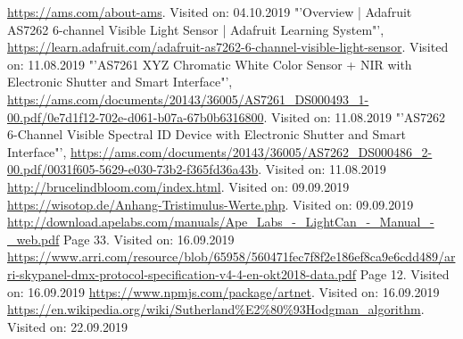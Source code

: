 \documentclass[11pt]{scrartcl}
\begin{document}
{\begin{thebibliography}{xxxxxxxxxxxxxxxxxxx}
     \url{https://ams.com/about-ams}. Visited on: 04.10.2019
    "'Overview | Adafruit AS7262 6-channel Visible Light Sensor | Adafruit Learning System"', \url{https://learn.adafruit.com/adafruit-as7262-6-channel-visible-light-sensor}. Visited on: 11.08.2019
    "'AS7261 XYZ Chromatic White Color Sensor + NIR with Electronic Shutter and Smart Interface"', \url{https://ams.com/documents/20143/36005/AS7261_DS000493_1-00.pdf/0e7d1f12-702e-d061-b07a-67b0b6316800}. Visited on: 11.08.2019
    "'AS7262 6-Channel Visible Spectral ID Device with Electronic Shutter and Smart Interface"', \url{https://ams.com/documents/20143/36005/AS7262_DS000486_2-00.pdf/0031f605-5629-e030-73b2-f365fd36a43b}. Visited on: 11.08.2019
     \url{http://brucelindbloom.com/index.html}. Visited on: 09.09.2019
     \url{https://wisotop.de/Anhang-Tristimulus-Werte.php}. Visited on: 09.09.2019
     \url{http://download.apelabs.com/manuals/Ape_Labs_-_LightCan_-_Manual_-_web.pdf} Page 33. Visited on: 16.09.2019
     \url{https://www.arri.com/resource/blob/65958/560471fec7f8f2e186ef8ca9e6cdd489/arri-skypanel-dmx-protocol-specification-v4-4-en-okt2018-data.pdf} Page 12. Visited on: 16.09.2019
     \url{https://www.npmjs.com/package/artnet}. Visited on: 16.09.2019
     \url{https://en.wikipedia.org/wiki/Sutherland%E2%80%93Hodgman_algorithm}. Visited on: 22.09.2019
\end{thebibliography}
\endgroup
\clearpage

\end{document}
